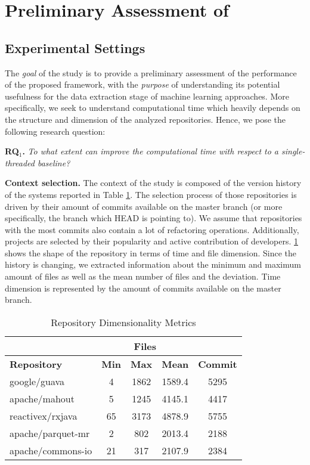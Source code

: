 
\section{Preliminary Assessment of \iris}
\label{sec:assessment}

\subsection{Experimental Settings}
\label{sec:method}
The \emph{goal} of the study is to provide a preliminary assessment of the performance of the proposed framework, with the \emph{purpose} of understanding its potential usefulness for the data extraction stage of machine learning approaches. More specifically, we seek to understand computational time which heavily depends on the structure and dimension of the analyzed repositories. Hence, we pose the following research question:

\begin{center}
	\begin{examplebox}
		\textbf{RQ$_1$.} \emph{To what extent can \iris improve the computational time with respect to a single-threaded baseline?}	
	\end{examplebox}
\end{center}

\textbf{Context selection.} The context of the study is composed of the version history of the systems reported in Table \ref{tab:systems}. The selection process of those repositories is driven by their amount of commits available on the master branch (or more specifically, the branch which HEAD is pointing to). We assume that repositories with the most commits also contain a lot of refactoring operations. Additionally, projects are selected by their popularity and active contribution of developers. \ref{tab:systems} shows the shape of the repository in terms of time and file dimension. Since the history is changing, we extracted information about the minimum and maximum amount of files as well as the mean number of files and the deviation. Time dimension is represented by the amount of commits available on the master branch.

\begin{table}[htbp]
\caption{Repository Dimensionality Metrics}
\label{tab:systems}
\begin{center}
\begin{tabular}{|l|c|c|c|c|}
\hline
&\multicolumn{3}{c|}{Files}&\\
\hline
\textbf{Repository}&\textbf{Min}&\textbf{Max}&\textbf{Mean}&\textbf{Commit}\\
\hline
google/guava& 4 & 1862 & 1589.4 & 5295\\
\hline
apache/mahout& 5 & 1245 & 4145.1 & 4417\\
\hline
reactivex/rxjava& 65 & 3173 & 4878.9 & 5755\\
\hline
apache/parquet-mr & 2 & 802 & 2013.4 & 2188\\
\hline
apache/commons-io & 21 & 317 & 2107.9 & 2384\\
\hline
\end{tabular}
\end{center}
\end{table}


